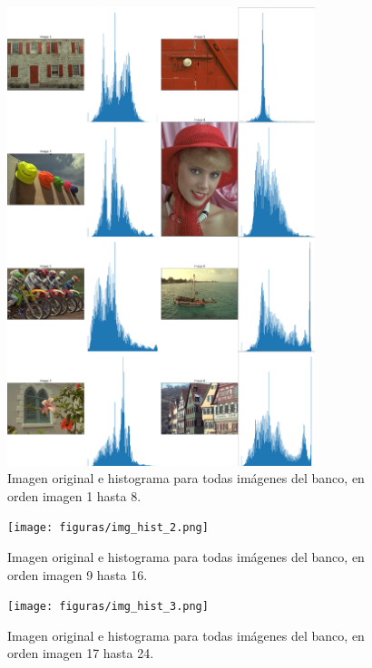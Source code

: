 \begin{figure}
    \centering
    \includegraphics[width=0.8\textwidth]{figuras/img_hist_1.png}
    \caption{Imagen original e histograma para todas im\'agenes del banco, en orden imagen 1 hasta 8.}
\end{figure}

\begin{figure}
    \centering
    \texttt{[image: figuras/img\_hist\_2.png]}
    \caption{Imagen original e histograma para todas im\'agenes del banco, en orden imagen 9 hasta 16.}
\end{figure}

\begin{figure}
    \centering
    \texttt{[image: figuras/img\_hist\_3.png]}
    \caption{Imagen original e histograma para todas im\'agenes del banco, en orden imagen 17 hasta 24.}
\end{figure}


